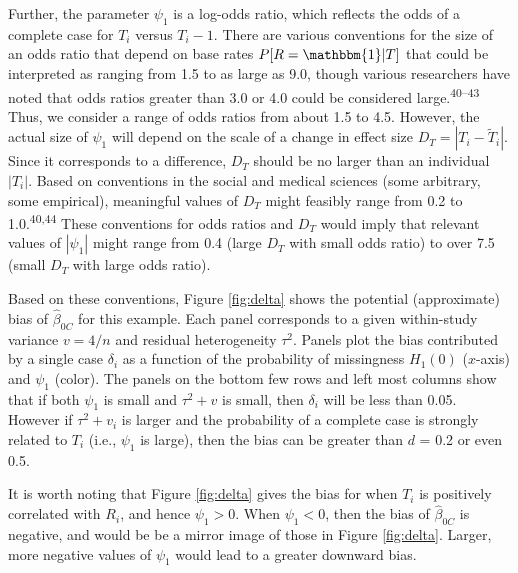 \documentclass[
]{article}
\begin{document}
Further, the parameter \(\psi_1\) is a log-odds ratio, which reflects the odds of a complete case for \(T_i\) versus \(T_i - 1\).
There are various conventions for the size of an odds ratio that depend on base rates \(P[R = \mathbbm{1} | T]\) that could be interpreted as ranging from 1.5 to as large as 9.0, though various researchers have noted that odds ratios greater than 3.0 or 4.0 could be considered large.\textsuperscript{40--43}
Thus, we consider a range of odds ratios from about 1.5 to 4.5.
However, the actual size of \(\psi_1\) will depend on the scale of a change in effect size \(D_T = |T_i - \tilde{T}_i|\).
Since it corresponds to a difference, \(D_T\) should be no larger than an individual \(|T_i|\).
Based on conventions in the social and medical sciences (some arbitrary, some empirical), meaningful values of \(D_T\) might feasibly range from 0.2 to 1.0.\textsuperscript{40,44}
These conventions for odds ratios and \(D_T\) would imply that relevant values of \(|\psi_1|\) might range from 0.4 (large \(D_T\) with small odds ratio) to over 7.5 (small \(D_T\) with large odds ratio).

Based on these conventions, Figure \ref{fig:delta} shows the potential (approximate) bias of \(\hat{\beta}_{0C}\) for this example.
Each panel corresponds to a given within-study variance \(v = 4/n\) and residual heterogeneity \(\tau^2\).
Panels plot the bias contributed by a single case \(\delta_i\) as a function of the probability of missingness \(H_1(0)\) (\(x\)-axis) and \(\psi_1\) (color).
The panels on the bottom few rows and left most columns show that if both \(\psi_1\) is small and \(\tau^2 + v\) is small, then \(\delta_i\) will be less than 0.05.
However if \(\tau^2 + v_i\) is larger and the probability of a complete case is strongly related to \(T_i\) (i.e., \(\psi_1\) is large), then the bias can be greater than \(d\) = 0.2 or even 0.5.

It is worth noting that Figure \ref{fig:delta} gives the bias for when \(T_i\) is positively correlated with \(R_i\), and hence \(\psi_1 > 0\).
When \(\psi_1 < 0\), then the bias of \(\hat{\beta}_{0C}\) is negative, and would be be a mirror image of those in Figure \ref{fig:delta}.
Larger, more negative values of \(\psi_1\) would lead to a greater downward bias.
\end{document}
